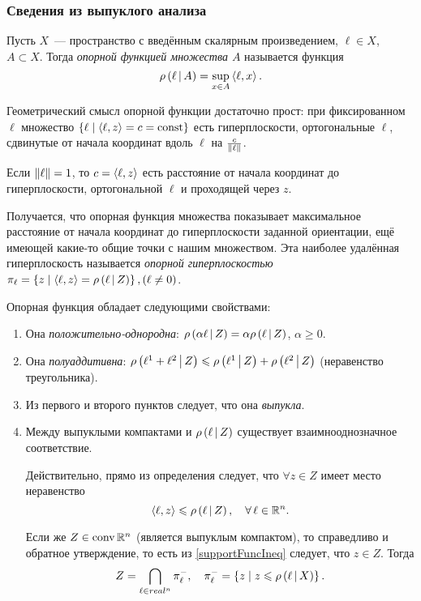 \subsubsection{Сведения из выпуклого анализа}

\begin{df}
  Пусть $X$~--- пространство с введённым скалярным произведением,
  $\ell \in X$, $A \subset X$.
  Тогда \emph{опорной функцией множества $A$}
  называется функция
  \begin{equation*}
    \rho\left(\ell\,\middle|\,A\right) = \sup_{x \in A}\left<\ell,x\right>.
  \end{equation*}
\end{df}

Геометрический смысл опорной функции достаточно прост:
при фиксированном $\ell$ множество
$\left\lbrace \ell \mid \left<\ell,z\right> = c = \operatorname{const} \right\rbrace$
есть гиперплоскости, ортогональные $\ell$,
сдвинутые от начала координат вдоль $\ell$ на $\frac{c}{\left\| \ell \right\|}$.

Если $\left\| \ell \right\| = 1$, то $c = \left<\ell,z\right>$ есть
расстояние от начала координат до гиперплоскости,
ортогональной $\ell$ и проходящей через $z$.

Получается, что опорная функция множества показывает
максимальное расстояние от начала координат до гиперплоскости
заданной ориентации, ещё имеющей какие-то общие точки с нашим множеством.
Эта наиболее удалённая гиперплоскость
называется \emph{опорной гиперплоскостью}
$\pi_\ell = \left\lbrace z \mid \left<\ell,z\right> = \rho\left(\ell\,\middle|\,Z\right) \right\rbrace,
(\ell \not = 0)$.

Опорная функция обладает следующими свойствами:

\begin{enumerate}
	\item
	Она \emph{положительно-однородна}:
	$\rho\left(\alpha \ell\,\middle|\,Z\right) = \alpha \rho\left(\ell\,\middle|\,Z\right)$, $\alpha \geqslant 0$.

	\item
	Она \emph{полуаддитивна}:
	$\rho\left(\ell^1 + \ell^2\,\middle|\,Z\right) \leqslant \rho\left(\ell^1\,\middle|\,Z\right) + \rho\left(\ell^2\,\middle|\,Z\right)$
	(неравенство треугольника).

	\item Из первого и второго пунктов следует, что она \emph{выпукла}.

	\item Между выпуклыми компактами и $\rho\left(\ell\,\middle|\,Z\right)$
	существует взаимнооднозначное соответствие.

Действительно, прямо из определения следует, что $\forall z\in Z$ имеет место неравенство 
\begin{equation}
  \label{supportFuncIneq}
	\scalar{\ell}{z} \leqslant \sufu{\ell}{Z},\quad \forall \ell \in \real^n.
\end{equation}

Если же $Z \in \operatorname{conv} \mathbb R^n$ (является выпуклым компактом),
то справедливо и обратное утверждение, то есть из \eqref{supportFuncIneq}
следует, что $z \in Z$. Тогда
\begin{equation*}
  Z = \bigcap\limits_{\ell \in real^n}{\pi^{-}_\ell},\quad
    \pi^{-}_\ell = \left\lbrace z \mid  z \leqslant \rho\left(\ell\,\middle|\,X\right) \right\rbrace.
\end{equation*}
\end{enumerate}